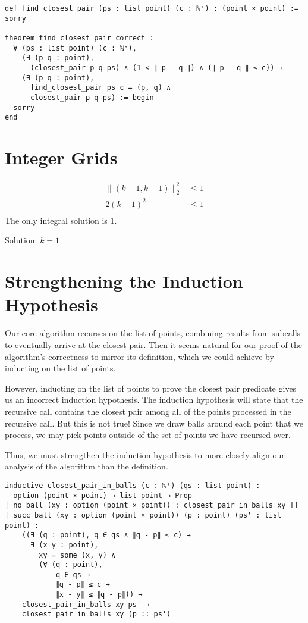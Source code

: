 \documentclass{article}
\begin{document}
\begin{verbatim}
def find_closest_pair (ps : list point) (c : ℕ⁺) : (point × point) := sorry

theorem find_closest_pair_correct :
  ∀ (ps : list point) (c : ℕ⁺),
    (∃ (p q : point),
      (closest_pair p q ps) ∧ (1 < ∥ p - q ∥) ∧ (∥ p - q ∥ ≤ c)) →
    (∃ (p q : point),
      find_closest_pair ps c = (p, q) ∧
      closest_pair p q ps) := begin
  sorry
end
\end{verbatim}


\section{Integer Grids}
\begin{align*}
  \| (k - 1, k-1) \|_2^2 &\leq 1 \\
  2(k-1)^2 & \leq 1 \\
\end{align*}
The only integral solution is 1.

Solution: $k=1$

\section{Strengthening the Induction Hypothesis}
Our core algorithm recurses on the list of points, combining results from subcalls to eventually arrive at the closest pair.
Then it seems natural for our proof of the algorithm's correctness to mirror its definition, which we could achieve by inducting on the list of points.

However, inducting on the list of points to prove the closest pair predicate gives us an incorrect induction hypothesis.
The induction hypothesis will state that the recursive call contains the closest pair among all of the points processed in the recursive call.
But this is not true!
Since we draw balls around each point that we process, we may pick points outside of the set of points we have recursed over.

Thus, we must strengthen the induction hypothesis to more closely align our analysis of the algorithm than the definition.

\begin{verbatim}
inductive closest_pair_in_balls (c : ℕ⁺) (qs : list point) :
  option (point × point) → list point → Prop
| no_ball (xy : option (point × point)) : closest_pair_in_balls xy []
| succ_ball (xy : option (point × point)) (p : point) (ps' : list point) :
    ((∃ (q : point), q ∈ qs ∧ ∥q - p∥ ≤ c) →
      ∃ (x y : point),
        xy = some (x, y) ∧
        (∀ (q : point),
            q ∈ qs →
            ∥q - p∥ ≤ c →
            ∥x - y∥ ≤ ∥q - p∥)) →
    closest_pair_in_balls xy ps' →
    closest_pair_in_balls xy (p :: ps')
\end{verbatim}
\end{document}
